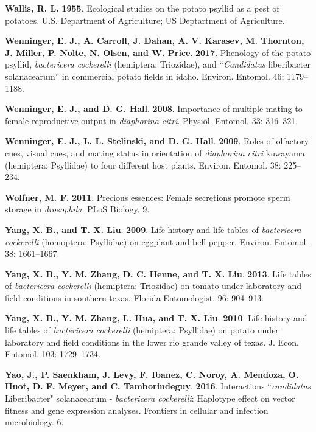 \documentclass[]{article}
\begin{document}
\leavevmode\hypertarget{ref-Wallis1955}{}%
\textbf{Wallis, R. L.} \textbf{1955}. Ecological studies on the potato
psyllid as a pest of potatoes. U.S. Department of Agriculture; US
Deptartment of Agriculture.

\leavevmode\hypertarget{ref-Wenninger2017}{}%
\textbf{Wenninger, E. J., A. Carroll, J. Dahan, A. V. Karasev, M.
Thornton, J. Miller, P. Nolte, N. Olsen, and W. Price}. \textbf{2017}.
Phenology of the potato psyllid, \emph{bactericera cockerelli}
(hemiptera: Triozidae), and ``\emph{Candidatus} liberibacter
solanacearum'' in commercial potato fields in idaho. Environ. Entomol.
46: 1179--1188.

\leavevmode\hypertarget{ref-Wenninger2008}{}%
\textbf{Wenninger, E. J., and D. G. Hall}. \textbf{2008}. Importance of
multiple mating to female reproductive output in \emph{diaphorina
citri}. Physiol. Entomol. 33: 316--321.

\leavevmode\hypertarget{ref-Wenninger2009}{}%
\textbf{Wenninger, E. J., L. L. Stelinski, and D. G. Hall}.
\textbf{2009}. Roles of olfactory cues, visual cues, and mating status
in orientation of \emph{diaphorina citri} kuwayama (hemiptera:
Psyllidae) to four different host plants. Environ. Entomol. 38:
225--234.

\leavevmode\hypertarget{ref-Wolfner2011}{}%
\textbf{Wolfner, M. F.} \textbf{2011}. Precious essences: Female
secretions promote sperm storage in \emph{drosophila}. PLoS Biology. 9.

\leavevmode\hypertarget{ref-Yang2009}{}%
\textbf{Yang, X. B., and T. X. Liu}. \textbf{2009}. Life history and
life tables of \emph{bactericera cockerelli} (homoptera: Psyllidae) on
eggplant and bell pepper. Environ. Entomol. 38: 1661--1667.

\leavevmode\hypertarget{ref-Yang2013}{}%
\textbf{Yang, X. B., Y. M. Zhang, D. C. Henne, and T. X. Liu}.
\textbf{2013}. Life tables of \emph{bactericera cockerelli} (hemiptera:
Triozidae) on tomato under laboratory and field conditions in southern
texas. Florida Entomologist. 96: 904--913.

\leavevmode\hypertarget{ref-Yang2010}{}%
\textbf{Yang, X. B., Y. M. Zhang, L. Hua, and T. X. Liu}. \textbf{2010}.
Life history and life tables of \emph{bactericera cockerelli}
(hemiptera: Psyllidae) on potato under laboratory and field conditions
in the lower rio grande valley of texas. J. Econ. Entomol. 103:
1729--1734.

\leavevmode\hypertarget{ref-Yao2016}{}%
\textbf{Yao, J., P. Saenkham, J. Levy, F. Ibanez, C. Noroy, A. Mendoza,
O. Huot, D. F. Meyer, and C. Tamborindeguy}. \textbf{2016}. Interactions
``\emph{candidatus} Liberibacter" solanacearum - \emph{bactericera
cockerelli}: Haplotype effect on vector fitness and gene expression
analyses. Frontiers in cellular and infection microbiology. 6.
\end{document}
